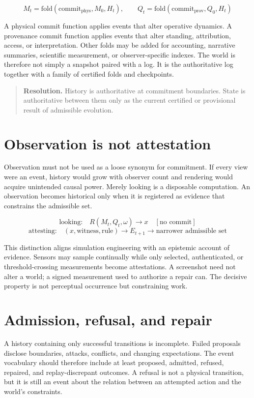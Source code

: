 \documentclass[11pt]{article}
\begin{document}
\[
M_t = \mathrm{fold}(\mathrm{commit}_{\mathrm{phys}}, M_0, H_t), \qquad Q_t = \mathrm{fold}(\mathrm{commit}_{\mathrm{prov}}, Q_0, H_t)
\]

A physical commit function applies events that alter operative dynamics. A provenance commit function applies events that alter standing, attribution, access, or interpretation. Other folds may be added for accounting, narrative summaries, scientific measurement, or observer-specific indexes. The world is therefore not simply a snapshot paired with a log. It is the authoritative log together with a family of certified folds and checkpoints.

\begin{quote}
\textbf{Resolution.} History is authoritative at commitment boundaries. State is authoritative between them only as the current certified or provisional result of admissible evolution.
\end{quote}

\section{Observation is not attestation}
\label{sec:attestation}

Observation must not be used as a loose synonym for commitment. If every view were an event, history would grow with observer count and rendering would acquire unintended causal power. Merely looking is a disposable computation. An observation becomes historical only when it is registered as evidence that constrains the admissible set.

\[
\text{looking:} \quad R(M_t, Q_t, \omega) \to x \quad [\text{no commit}]
\]
\[
\text{attesting:} \quad (x, \text{witness}, \text{rule}) \to E_{t+1} \to \text{narrower admissible set}
\]

This distinction aligns simulation engineering with an epistemic account of evidence. Sensors may sample continually while only selected, authenticated, or threshold-crossing measurements become attestations. A screenshot need not alter a world; a signed measurement used to authorize a repair can. The decisive property is not perceptual occurrence but constraining work.

\section{Admission, refusal, and repair}
\label{sec:admission}

A history containing only successful transitions is incomplete. Failed proposals disclose boundaries, attacks, conflicts, and changing expectations. The event vocabulary should therefore include at least proposed, admitted, refused, repaired, and replay-discrepant outcomes. A refusal is not a physical transition, but it is still an event about the relation between an attempted action and the world's constraints.
\end{document}
